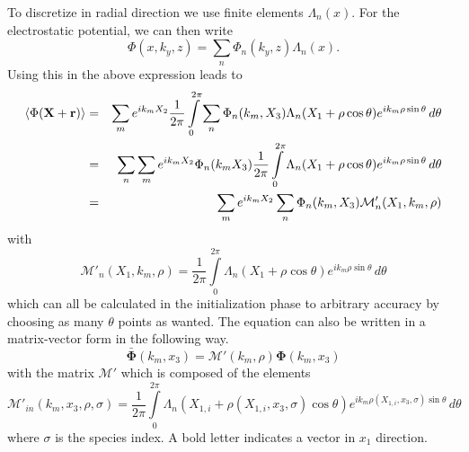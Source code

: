 To discretize in radial direction we use finite elements
$\Lambda_n(x)$. For the electrostatic potential, we can then write
\begin{displaymath}
  \Phi(x,k_y,z) = \sum_n \Phi_n(k_y,z)\Lambda_n(x).
\end{displaymath}
Using this in the above expression leads to
\begin{eqnarray*}
  \left\langle \Phi(\mathbf{X}+\mathbf{r}) \right\rangle 
  &=& \sum_m e^{ik_mX_2} \frac{1}{2\pi}\int\limits_0^{2\pi}
  \sum_n \Phi_{n}(k_m,X_3)\Lambda_n(X_1+\rho\cos\theta) e^{ik_m \rho\sin\theta}\,d\theta\\
  &=& \sum_n \sum_m e^{ik_mX_2} \Phi_{n}(k_mX_3) \frac{1}{2\pi}\int\limits_0^{2\pi}
  \Lambda_n(X_1+\rho\cos\theta) e^{ik_m \rho\sin\theta}\,d\theta\\
  &=& \sum_m e^{ik_mX_2} \sum_n \Phi_{n}(k_m,X_3) \mathcal{M}'_{n}(X_1,k_m,\rho)
\end{eqnarray*}
with
\begin{displaymath}
  \mathcal{M}'_{n}(X_1,k_m,\rho)= \frac{1}{2\pi}\int\limits_0^{2\pi}
  \Lambda_n(X_1+\rho\cos\theta) e^{ik_m \rho\sin\theta}\,d\theta
\end{displaymath}
which can all be calculated in the initialization phase to arbitrary
accuracy by choosing as many $\theta$ points as wanted.
The equation can also be written in a matrix-vector form in the
following way.
\begin{displaymath}
  \bar{\mathbf{\Phi}}(k_m,x_3) = \mathcal{M}'(k_m,\rho)\mathbf{\Phi}(k_m,x_3) 
\end{displaymath}
with the matrix $\mathcal{M}'$ which is composed of the elements 
\begin{displaymath}
  \mathcal{M}'_{in}(k_m,x_3,\rho,\sigma) = \frac{1}{2\pi}\int\limits_0^{2\pi}
  \Lambda_n(X_{1,i}+\rho(X_{1,i},x_3,\sigma)\cos\theta) e^{ik_m \rho(X_{1,i},x_3,\sigma)\sin\theta}\,d\theta
\end{displaymath}
where $\sigma$ is the species index. A bold letter indicates a vector
in $x_1$ direction.

